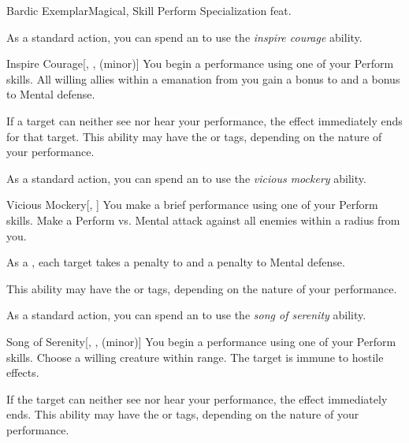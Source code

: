    \begin{feat}{Bardic Exemplar}{Magical, Skill}
        \featpre Perform Specialization feat.

         As a standard action, you can spend an  to use the \textit{inspire courage} ability.
        \begin{ability}{Inspire Courage}[, ,  (minor)]
            You begin a performance using one of your Perform skills.
            All willing allies within a \areahuge emanation from you gain a  bonus to  and a  bonus to Mental defense.

            If a target can neither see nor hear your performance, the effect immediately ends for that target.
            This ability may have the  or  tags, depending on the nature of your performance.
        \end{ability}

         As a standard action, you can spend an  to use the \textit{vicious mockery} ability.
        \begin{ability}{Vicious Mockery}[, ]
            You make a brief performance using one of your Perform skills.
            Make a Perform vs. Mental attack against all enemies within a \areahuge radius from you.

            \hit As a , each target takes a  penalty to  and a  penalty to Mental defense.

            This ability may have the  or  tags, depending on the nature of your performance.
        \end{ability}

         As a standard action, you can spend an  to use the \textit{song of serenity} ability.
        \begin{ability}{Song of Serenity}[, ,  (minor)]
            You begin a performance using one of your Perform skills.
            Choose a willing creature within \rngmed range.
            The target is immune to hostile  effects.

            If the target can neither see nor hear your performance, the effect immediately ends.
            This ability may have the  or  tags, depending on the nature of your performance.
        \end{ability}


\end{feat}
